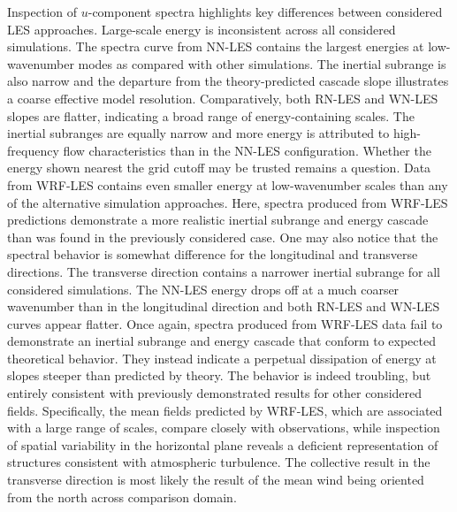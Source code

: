 Inspection of $u$-component spectra highlights key differences between considered LES approaches. Large-scale energy is inconsistent across all considered simulations. The spectra curve from NN-LES contains the largest energies at low-wavenumber modes as compared with other simulations. The inertial subrange is also narrow and the departure from the theory-predicted cascade slope illustrates a coarse effective model resolution. Comparatively, both RN-LES and WN-LES slopes are flatter, indicating a broad range of energy-containing scales. The inertial subranges are equally narrow and more energy is attributed to high-frequency flow characteristics than in the NN-LES configuration. Whether the energy shown nearest the grid cutoff may be trusted remains a question. Data from WRF-LES contains even smaller energy at low-wavenumber scales than any of the alternative simulation approaches. Here, spectra produced from WRF-LES predictions demonstrate a more realistic inertial subrange and energy cascade than was found in the previously considered case. One may also notice that the spectral behavior is somewhat difference for the longitudinal and transverse directions. The transverse direction contains a narrower inertial subrange for all considered simulations. The NN-LES energy drops off at a much coarser wavenumber than in the longitudinal direction and both RN-LES and WN-LES curves appear flatter. Once again, spectra produced from WRF-LES data fail to demonstrate an inertial subrange and energy cascade that conform to expected theoretical behavior. They instead indicate a perpetual dissipation of energy at slopes steeper than predicted by theory. The behavior is indeed troubling, but entirely consistent with previously demonstrated results for other considered fields. Specifically, the mean fields predicted by WRF-LES, which are associated with a large range of scales, compare closely with observations, while inspection of spatial variability in the horizontal plane reveals a deficient representation of structures consistent with atmospheric turbulence. The collective result in the transverse direction is most likely the result of the mean wind being oriented from the north across comparison domain.

